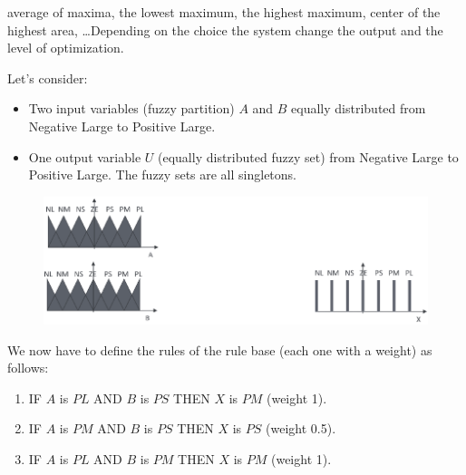 \documentclass[12pt, a4paper]{report}
\newtheorem[style=M,bodystyle=\normalfont]{theorem}{Theorem}
\newtheorem[style=M,bodystyle=\normalfont]{corollary}{Corollary}
\newtheorem[style=M,bodystyle=\normalfont]{lemma}{Lemma}
\newtheorem[style=M,bodystyle=\normalfont]{definition}{Definition}
\begin{document}
    average of maxima, the lowest maximum, the highest maximum, center of the highest area, \dots Depending on the choice the system change the 
    output and the level of optimization. 
    \begin{example}
        Let's consider:
        \begin{itemize}
            \item Two input variables (fuzzy partition) $A$ and $B$ equally distributed from Negative Large to Positive Large. 
            \item One output variable $U$ (equally distributed fuzzy set) from Negative Large to Positive Large. The fuzzy sets are all singletons.
        \end{itemize} 
        \begin{figure}[H]
            \centering
            \includegraphics[width=0.75\linewidth]{images/rules.png}
        \end{figure}
        We now have to define the rules of the rule base (each one with a weight) as follows: 
        \begin{enumerate}
            \item IF $A$ is $PL$ AND $B$ is $PS$ THEN $X$ is $PM$ (weight 1).
            \item IF $A$ is $PM$ AND $B$ is $PS$ THEN $X$ is $PS$ (weight 0.5).
            \item IF $A$ is $PL$ AND $B$ is $PM$ THEN $X$ is $PM$ (weight 1).
        \end{enumerate}


\end{example}
\end{document}
